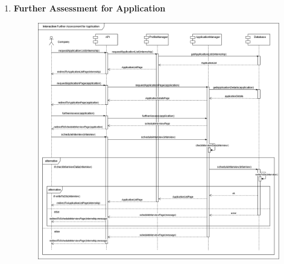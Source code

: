 \begin{enumerate}
    \newpage
    \item \textbf{Further Assessment for Application}
    \begin{figure}[h!]
            \centering  \includegraphics[width=1\textwidth]{DD/Images/Interactions/INT15_FurtherAssessmentForApplication.drawio.png}
            \label{fig:ComponentViewDiagram}
    \end{figure}


\end{enumerate}
